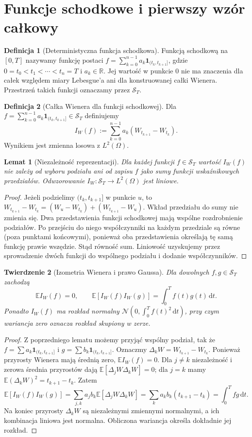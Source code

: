 \documentclass[11pt,a4paper,oneside]{report}
\numberwithin{equation}{chapter}
\theoremstyle{plain}
\newtheorem{twierdzenie}{Twierdzenie}[chapter]
\newtheorem{lemat}[twierdzenie]{Lemat}
\theoremstyle{definition}
\newtheorem{definicja}{Definicja}[chapter]
\theoremstyle{remark}
\newcommand{\R}{\mathbb{R}}
\newcommand{\E}{\mathbb{E}}
\newcommand{\calS}{\mathcal{S}}
\newcommand{\ind}[1]{\mathbf{1}_{#1}}
\newcommand{\dd}{\mathrm{d}}
\newcommand{\Normal}{\mathcal{N}}
\begin{document}
\section{Funkcje schodkowe i pierwszy wzór całkowy}
\begin{definicja}[Deterministyczna funkcja schodkowa]
Funkcją schodkową na $[0,T]$ nazywamy funkcję postaci
$f=\sum_{k=0}^{n-1}a_k\ind{(t_k,t_{k+1}]}$, gdzie
$0=t_0<t_1<\cdots<t_n=T$ i $a_k\in\R$.
Jej wartość w punkcie $0$ nie ma znaczenia dla całek względem
miary Lebesgue'a ani dla konstruowanej całki Wienera.
Przestrzeń takich funkcji oznaczamy przez $\calS_T$.
\end{definicja}

\begin{definicja}[Całka Wienera dla funkcji schodkowej]
Dla $f=\sum_{k=0}^{n-1}a_k\ind{(t_k,t_{k+1}]}\in\calS_T$
definiujemy
\[
I_W(f):=\sum_{k=0}^{n-1}a_k(W_{t_{k+1}}-W_{t_k}).
\tag{1.1}\label{eq:wiener-simple}
\]
Wynikiem jest zmienna losowa z $L^2(\Omega)$.
\end{definicja}

\begin{lemat}[Niezależność reprezentacji]
Dla każdej funkcji $f\in\calS_T$ wartość $I_W(f)$
nie zależy od wyboru podziału ani od zapisu $f$ jako sumy
funkcji wskaźnikowych przedziałów. Odwzorowanie
$I_W:\calS_T\to L^2(\Omega)$ jest liniowe.
\end{lemat}
\begin{proof}
Jeżeli podzielimy $(t_k,t_{k+1}]$ w punkcie $u$, to
$W_{t_{k+1}}-W_{t_k}=(W_u-W_{t_k})+(W_{t_{k+1}}-W_u)$.
Wkład przedziału do sumy nie zmienia się. Dwa przedstawienia
funkcji schodkowej mają wspólne rozdrobnienie podziałów.
Po przejściu do niego współczynniki na każdym przedziale są
równe (poza punktami końcowymi), ponieważ oba przedstawienia
określają tę samą funkcję prawie wszędzie. Stąd równość sum.
Liniowość uzyskujemy przez sprowadzenie dwóch funkcji do
wspólnego podziału i dodanie współczynników.
\end{proof}

\begin{twierdzenie}[Izometria Wienera i prawo Gaussa]\label{th:wiener-isometry}
Dla dowolnych $f,g\in\calS_T$ zachodzą
\[
\E I_W(f)=0,\qquad
\E[I_W(f)I_W(g)]=\int_0^T f(t)g(t)\,\dd t.
\tag{1.2}\label{eq:wienscalar}
\]
Ponadto $I_W(f)$ ma rozkład normalny
$\Normal(0,\int_0^Tf(t)^2\,\dd t)$,
przy czym wariancja zero oznacza rozkład skupiony w zerze.
\end{twierdzenie}
\begin{proof}
Z poprzedniego lematu możemy przyjąć wspólny podział,
tak że $f=\sum a_k\ind{(t_k,t_{k+1}]}$ i
$g=\sum b_k\ind{(t_k,t_{k+1}]}$. Oznaczmy
$\Delta_kW=W_{t_{k+1}}-W_{t_k}$. Ponieważ przyrosty Wienera
mają średnią zero, $\E I_W(f)=0$. Dla $j\ne k$
niezależność i zerowa średnia przyrostów dają
$\E[\Delta_jW\Delta_kW]=0$; dla $j=k$ mamy
$\E(\Delta_kW)^2=t_{k+1}-t_k$. Zatem
\[
\E[I_W(f)I_W(g)]
=\sum_{j,k}a_jb_k\E[\Delta_jW\Delta_kW]
=\sum_k a_kb_k(t_{k+1}-t_k)
=\int_0^Tfg\,\dd t.
\]
Na koniec przyrosty $\Delta_kW$ są niezależnymi zmiennymi
normalnymi, a ich kombinacja liniowa jest normalna.
Obliczona wariancja określa dokładnie jej rozkład.
\end{proof}
\end{document}
